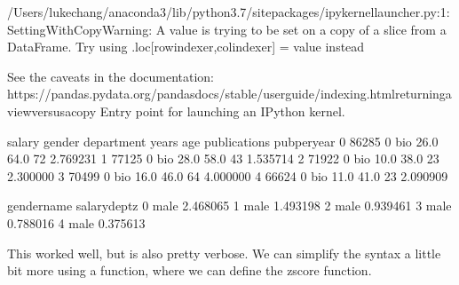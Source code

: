 \documentclass[letterpaper,10pt,english]{sphinxmanual}
\begin{document}
\begin{sphinxVerbatim}[commandchars=\\\{\}]
/Users/lukechang/anaconda3/lib/python3.7/site\PYGZhy{}packages/ipykernel\PYGZus{}launcher.py:1: SettingWithCopyWarning: 
A value is trying to be set on a copy of a slice from a DataFrame.
Try using .loc[row\PYGZus{}indexer,col\PYGZus{}indexer] = value instead

See the caveats in the documentation: https://pandas.pydata.org/pandas\PYGZhy{}docs/stable/user\PYGZus{}guide/indexing.html\PYGZsh{}returning\PYGZhy{}a\PYGZhy{}view\PYGZhy{}versus\PYGZhy{}a\PYGZhy{}copy
  \PYGZdq{}\PYGZdq{}\PYGZdq{}Entry point for launching an IPython kernel.
\end{sphinxVerbatim}

\begin{sphinxVerbatim}[commandchars=\\\{\}]
   salary  gender department  years   age  publications  pub\PYGZus{}per\PYGZus{}year  \PYGZbs{}
0   86285       0        bio   26.0  64.0            72      2.769231   
1   77125       0        bio   28.0  58.0            43      1.535714   
2   71922       0        bio   10.0  38.0            23      2.300000   
3   70499       0        bio   16.0  46.0            64      4.000000   
4   66624       0        bio   11.0  41.0            23      2.090909   

  gender\PYGZus{}name  salary\PYGZus{}dept\PYGZus{}z  
0        male       2.468065  
1        male       1.493198  
2        male       0.939461  
3        male       0.788016  
4        male       0.375613  
\end{sphinxVerbatim}

This worked well, but is also pretty verbose. We can simplify the syntax a little bit more using a  function, where we can define the zscore function.

\begin{sphinxVerbatim}[commandchars=\\\{\}]
        

\PYG{p}{[}\PYG{p}{]}  \PYG{p}{[}\PYG{p}{]}\PYG{p}{[}\PYG{p}{]}

\end{sphinxVerbatim}
\end{document}
